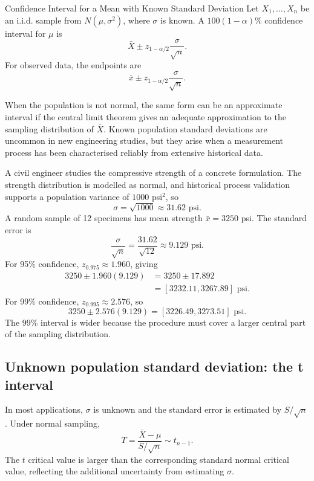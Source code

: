 \begin{theorem}{Confidence Interval for a Mean with Known Standard Deviation}
Let $X_1,\ldots,X_n$ be an i.i.d. sample from $N(\mu,\sigma^2)$, where $\sigma$ is known. A $100(1-\alpha)\%$ confidence interval for $\mu$ is
\[
    \bar X
      \pm
      z_{1-\alpha/2}\frac{\sigma}{\sqrt n}.
\]
For observed data, the endpoints are
\[
    \bar x
      \pm
      z_{1-\alpha/2}\frac{\sigma}{\sqrt n}.
\]
\end{theorem}

When the population is not normal, the same form can be an approximate interval if the central limit theorem gives an adequate approximation to the sampling distribution of $\bar X$. Known population standard deviations are uncommon in new engineering studies, but they arise when a measurement process has been characterised reliably from extensive historical data.

\begin{example}\par
A civil engineer studies the compressive strength of a concrete formulation. The strength distribution is modelled as normal, and historical process validation supports a population variance of $1000$ psi$^2$, so
\[
    \sigma=\sqrt{1000}\approx31.62\text{ psi}.
\]
A random sample of 12 specimens has mean strength $\bar x=3250$ psi. The standard error is
\[
    \frac{\sigma}{\sqrt n}
      =\frac{31.62}{\sqrt{12}}
      \approx9.129\text{ psi}.
\]
For 95\% confidence, $z_{0.975}\approx1.960$, giving
\[
\begin{aligned}
    3250\pm1.960(9.129)
      &=3250\pm17.892\\
      &=[3232.11,3267.89]\text{ psi}.
\end{aligned}
\]
For 99\% confidence, $z_{0.995}\approx2.576$, so
\[
    3250\pm2.576(9.129)
      =[3226.49,3273.51]\text{ psi}.
\]
The 99\% interval is wider because the procedure must cover a larger central part of the sampling distribution.
\end{example}

\subsection{Unknown population standard deviation: the t interval}

In most applications, $\sigma$ is unknown and the standard error is estimated by $S/\sqrt n$. Under normal sampling,
\[
    T=\frac{\bar X-\mu}{S/\sqrt n}
      \sim t_{n-1}.
\]
The $t$ critical value is larger than the corresponding standard normal critical value, reflecting the additional uncertainty from estimating $\sigma$.

